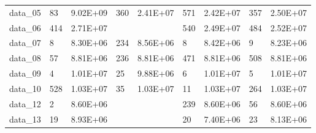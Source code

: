 \begin{table}[]
\begin{tabular}{lllllllll}
data\_05 & 83                                     & 9.02E+09                                   & 360                                      & 2.41E+07                                     & 571                                          & 2.42E+07                                        & 357             & 2.50E+07           \\
data\_06 & 414                                    & 2.71E+07                                   &                                          &                                              & 540                                          & 2.49E+07                                        & 484             & 2.52E+07           \\
data\_07 & 8                                      & 8.30E+06                                   & 234                                      & 8.56E+06                                     & 8                                            & 8.42E+06                                        & 9               & 8.23E+06           \\
data\_08 & 57                                     & 8.81E+06                                   & 236                                      & 8.81E+06                                     & 471                                          & 8.81E+06                                        & 508             & 8.81E+06           \\
data\_09 & 4                                      & 1.01E+07                                   & 25                                       & 9.88E+06                                     & 6                                            & 1.01E+07                                        & 5               & 1.01E+07           \\
data\_10 & 528                                    & 1.03E+07                                   & 35                                       & 1.03E+07                                     & 11                                           & 1.03E+07                                        & 264             & 1.03E+07           \\
data\_12 & 2                                      & 8.60E+06                                   &                                          &                                              & 239                                          & 8.60E+06                                        & 56              & 8.60E+06           \\
data\_13 & 19                                     & 8.93E+06                                   &                                          &                                              & 20                                           & 7.40E+06                                        & 23              & 8.13E+06           \\

\end{tabular}
\end{table}

